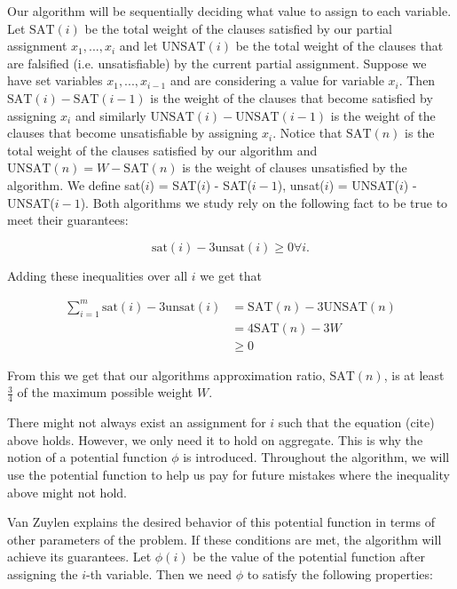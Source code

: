 \documentclass[11pt,letter]{article}
\begin{document}
Our algorithm will be sequentially deciding what value to assign to each variable. Let $\mathrm{SAT}(i)$ be the total weight of the clauses
satisfied by our partial assignment $x_1, ..., x_i$ and let $\mathrm{UNSAT}(i)$ be the total weight of the clauses that are falsified (i.e. unsatisfiable) by the current partial assignment.
Suppose we have set variables $x_1,...,x_{i-1}$ and are considering a value for variable $x_i$. Then $\mathrm{SAT}(i)-\mathrm{SAT}(i-1)$ is the weight
of the clauses that become satisfied by assigning $x_i$ and similarly $\mathrm{UNSAT}(i) - \mathrm{UNSAT}(i-1)$ is the weight of the clauses that become
unsatisfiable by assigning $x_i$.
Notice that $\mathrm{SAT}(n)$ is the total weight of the clauses satisfied by our algorithm and $\mathrm{UNSAT}(n) = W - \mathrm{SAT}(n)$ is the weight of clauses
unsatisfied by the algorithm. We define sat($i$) = SAT($i$) - SAT($i-1$), unsat($i$) = UNSAT($i$) - UNSAT($i-1$). Both algorithms we study rely on the following fact to be true to meet their guarantees:

\begin{equation}
\label{eq:1}
\mathrm{sat}(i) - 3\mathrm{unsat}(i) \geq 0 \forall i.
\end{equation}

Adding these inequalities over all $i$ we get that

\begin{equation*}
\begin{aligned}
\sum_{i = 1}^{m} \mathrm{sat}(i) - 3\mathrm{unsat}(i) & = \mathrm{SAT}(n) - 3\mathrm{UNSAT}(n) \\
& = 4\mathrm{SAT}(n) - 3W \\
& \geq 0
\end{aligned}
\end{equation*}

From this we get that our algorithms approximation ratio, $\mathrm{SAT}(n)$, is at least $\frac{3}{4}$ of the maximum possible weight $W$.

There might not always exist an assignment for $i$ such that the equation (cite) above holds. However, we only need it to hold on aggregate.
This is why the notion of a potential function $\phi$ is introduced. Throughout the algorithm, we will use the potential function to help us pay
for future mistakes where the inequality above might not hold.

Van Zuylen explains the desired behavior of this potential function in terms of other parameters of the problem. If these conditions are met, the algorithm
will achieve its guarantees. Let $\phi(i)$ be the value of the potential function after assigning the $i$-th variable. Then we need $\phi$ to satisfy the following properties:
\end{document}
